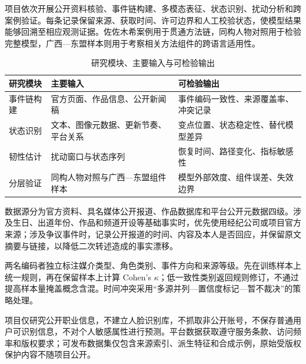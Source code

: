 \GXNSFBodyText


项目依次开展公开资料核验、事件链构建、多模态表征、状态识别、扰动分析和跨案例验证。每条记录保留来源、获取时间、许可边界和人工校验状态，使模型结果能够回溯至相应观测证据。佐佐木希案例用于贯通方法链，同构人物对照用于检验完整模型，广西—东盟样本则用于考察相关方法组件的跨语言适用性。

\begin{table}[htbp]
  \centering
  \fontsize{10}{14}\selectfont
  \caption{研究模块、主要输入与可检验输出}
  \begin{tabularx}{\textwidth}{p{}X X}
    \toprule
    研究模块 & 主要输入 & 可检验输出 \\
    \midrule
    事件链构建 & 官方页面、作品信息、公开新闻稿 & 事件编码一致性、来源覆盖率、冲突记录 \\
    状态识别 & 文本、图像元数据、更新节奏、平台关系 & 变点位置、状态稳定性、替代模型差异 \\
    韧性估计 & 扰动窗口与状态序列 & 恢复时间、路径变化、指标敏感性 \\
    分层验证 & 同构人物对照与广西—东盟组件样本 & 模型外部效度、组件误差、失效边界 \\
    \bottomrule
  \end{tabularx}
  \label{tab:gx-modules}
\end{table}


数据源分为官方资料、具名媒体公开报道、作品数据库和平台公开元数据四级。涉及生日、出道年份、作品和频道开设等基础事实时，优先使用经纪公司或项目官方来源；涉及争议事件时，记录公开报道的时间、内容及本人是否回应，并保留原文摘要与链接，以降低二次转述造成的事实漂移。

两名编码者独立标注媒介类型、角色类别、事件方向和来源等级。先在训练样本上统一规则，再在保留样本上计算 Cohen's $\kappa$；低一致性类别返回规则修订，不通过提高样本量掩盖概念含混。时间冲突采用“多源并列—置信度标记—暂不裁决”的策略处理。

项目仅研究公开职业信息，不建立人脸识别库，不抓取非公开账号，不保存普通用户可识别信息，不对个人敏感属性进行预测。平台数据获取遵守服务条款、访问频率和版权要求；可发布数据集仅包含来源索引、派生特征和合成示例，原始受版权保护内容不随项目公开。


